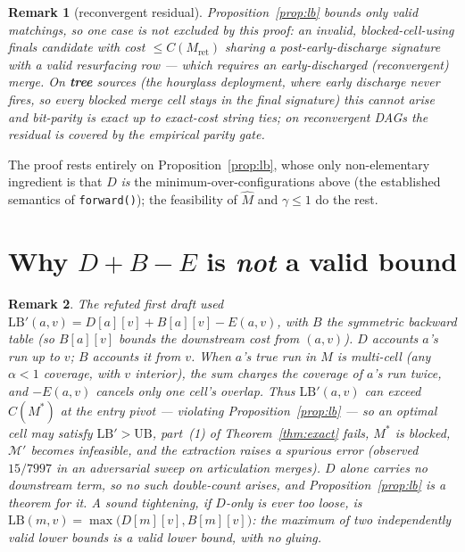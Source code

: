 \documentclass[11pt]{article}
\newtheorem*{remark}{Remark}
\newcommand{\Mh}{\widehat{M}}
\newcommand{\Mcal}{\mathcal{M}}
\newcommand{\Mst}{M^{\ast}}
\begin{document}
\begin{remark}[reconvergent residual]
Proposition~\ref{prop:lb} bounds only \emph{valid} matchings, so one case is not excluded by this proof:
an \emph{invalid}, blocked-cell-using finals candidate with cost $\le C(M_{\mathrm{ret}})$ sharing a
\emph{post-early-discharge} signature with a valid resurfacing row --- which requires an early-discharged
(reconvergent) merge. On \textbf{tree} sources (the hourglass deployment, where early discharge never
fires, so every blocked merge cell stays in the final signature) this cannot arise and bit-parity is
exact up to exact-cost string ties; on reconvergent DAGs the residual is covered by the empirical parity
gate.
\end{remark}

The proof rests entirely on Proposition~\ref{prop:lb}, whose only non-elementary ingredient is that
$D$ \emph{is} the minimum-over-configurations above (the established semantics of \texttt{forward()});
the feasibility of $\Mh$ and $\gamma\le 1$ do the rest.

\section*{Why $D+B-E$ is \emph{not} a valid bound}

\begin{remark}
The refuted first draft used $\mathrm{LB}'(a,v)=D[a][v]+B[a][v]-E(a,v)$, with $B$ the symmetric
backward table (so $B[a][v]$ bounds the \emph{downstream} cost from $(a,v)$). $D$ accounts $a$'s run
\emph{up to} $v$; $B$ accounts it \emph{from} $v$. When $a$'s true run in $M$ is multi-cell (any
$\alpha<1$ coverage, with $v$ interior), the sum charges the coverage of $a$'s run \emph{twice}, and
$-E(a,v)$ cancels only one cell's overlap. Thus $\mathrm{LB}'(a,v)$ can \emph{exceed} $C(\Mst)$ at the
entry pivot --- violating Proposition~\ref{prop:lb} --- so an optimal cell may satisfy
$\mathrm{LB}'>\mathrm{UB}$, part~(1) of Theorem~\ref{thm:exact} fails, $\Mst$ is blocked, $\Mcal'$
becomes infeasible, and the extraction raises a spurious error (observed $15/7997$ in an adversarial
sweep on articulation merges). $D$ alone carries no downstream term, so no such double-count arises,
and Proposition~\ref{prop:lb} is a theorem for it. A sound tightening, if $D$-only is ever too loose,
is $\mathrm{LB}(m,v)=\max\bigl(D[m][v],B[m][v]\bigr)$: the maximum of two independently valid lower
bounds is a valid lower bound, with no gluing.
\end{remark}
\end{document}
